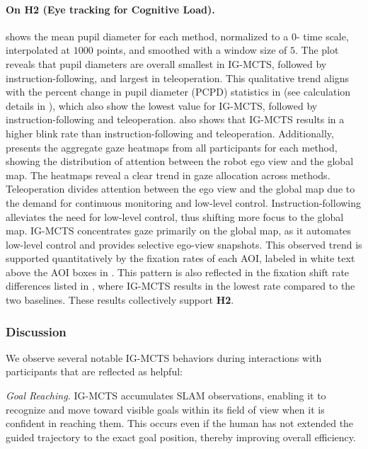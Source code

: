 \paragraph{On H2 (Eye tracking for Cognitive Load).}
 shows the mean pupil diameter for each method, normalized to a $0\text{-}$ time scale, interpolated at $1000$ points, and smoothed with a window size of $5$.
The plot reveals that pupil diameters are overall smallest in IG-MCTS, followed by instruction-following, and largest in teleoperation. This qualitative trend aligns with the percent change in pupil diameter (PCPD) statistics in  (see calculation details in ), which also show the lowest value for IG-MCTS, followed by instruction-following and teleoperation.
 also shows that IG-MCTS results in a higher blink rate than instruction-following and teleoperation.
Additionally,  presents the aggregate gaze heatmaps from all participants for each method, showing the distribution of attention between the robot ego view and the global map. 
The heatmaps reveal a clear trend in gaze allocation across methods. Teleoperation divides attention between the ego view and the global map due to the demand for continuous monitoring and low-level control. Instruction-following alleviates the need for low-level control, thus shifting more focus to the global map. IG-MCTS concentrates gaze primarily on the global map, as it automates low-level control and provides selective ego-view snapshots.
This observed trend is supported quantitatively by the fixation rates of each AOI, labeled in white text above the AOI boxes in .
This pattern is also reflected in the fixation shift rate differences listed in , where IG-MCTS results in the lowest rate compared to the two baselines.
These results collectively support \textbf{H2}.

\subsubsection{Discussion}
We observe several notable IG-MCTS behaviors during interactions with participants that are reflected as helpful:

\emph{Goal Reaching.}
IG-MCTS accumulates SLAM observations, enabling it to recognize and move toward visible goals within its field of view when it is confident in reaching them. This occurs even if the human has not extended the guided trajectory to the exact goal position, thereby improving overall efficiency.

